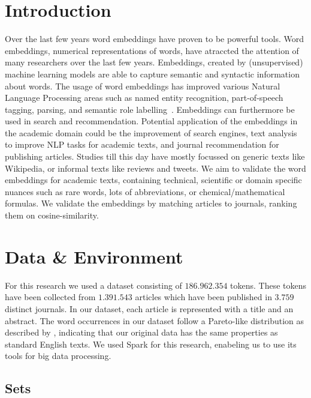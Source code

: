 \documentclass[runningheads]{llncs}
\begin{document}
\section{Introduction}
Over the last few years word embeddings have proven to be powerful tools. Word embeddings, numerical representations of words, have atraccted the attention of many researchers over the last few years. Embeddings, created by (unsupervised) machine learning models\cite{lai2016generate} are able to capture semantic and syntactic information about words\cite{mikolov2013distributed}. The usage of word embeddings has improved various Natural Language Processing areas such as named entity recognition, part-of-speech tagging, parsing, and semantic role labelling~\cite{luong2013better}. Embeddings can furthermore be used in search and recommendation. Potential application of the embeddings in the academic domain could be the improvement of search engines, text analysis to improve NLP tasks for academic texts, and journal recommendation for publishing articles. Studies till this day have mostly focussed on generic texts like Wikipedia, or informal texts like reviews and tweets. We aim to validate the word embeddings for academic texts, containing technical, scientific or domain specific nuances such as rare words, lots of abbreviations, or chemical/mathematical formulas. We validate the embeddings by matching articles to journals, ranking them on cosine-similarity.
\section{Data \& Environment}
For this research we used a dataset consisting of $186.962.354$ tokens. These tokens have been collected from $1.391.543$ articles which have been published in $3.759$ distinct journals. In our dataset, each article is represented with a title and an abstract. The word occurrences in our dataset follow a Pareto-like distribution as described by \citet{wiegand2018word}, indicating that our original data has the same properties as standard English texts. We used Spark for this research, enabeling us to use its tools for big data processing\cite{armbrust2015spark}.
\subsection{Sets}
\end{document}
